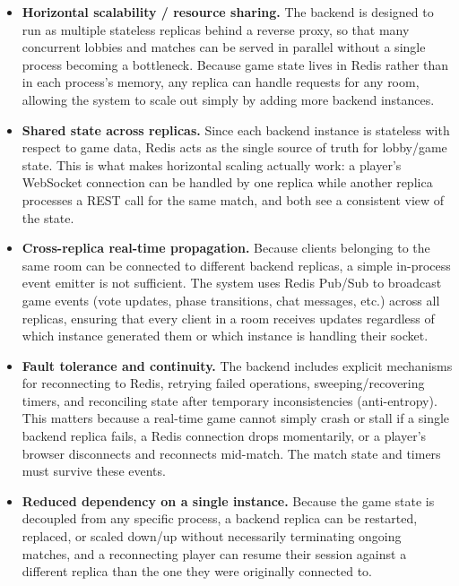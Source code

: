 \documentclass{scrartcl}
\begin{document}
\begin{itemize}
      \item \textbf{Horizontal scalability / resource sharing.} The backend is
            designed to run as multiple stateless replicas behind a reverse proxy, so
            that many concurrent lobbies and matches can be served in parallel without a
            single process becoming a bottleneck. Because game state lives in Redis
            rather than in each process's memory, any replica can handle requests for any
            room, allowing the system to scale out simply by adding more backend
            instances.

      \item \textbf{Shared state across replicas.} Since each backend instance is
            stateless with respect to game data, Redis acts as the single source of truth
            for lobby/game state. This is what makes horizontal scaling actually work: a
            player's WebSocket connection can be handled by one replica while another
            replica processes a REST call for the same match, and both see a consistent
            view of the state.

      \item \textbf{Cross-replica real-time propagation.} Because clients belonging
            to the same room can be connected to different backend replicas, a simple
            in-process event emitter is not sufficient. The system uses Redis Pub/Sub to
            broadcast game events (vote updates, phase transitions, chat messages, etc.)
            across all replicas, ensuring that every client in a room receives updates
            regardless of which instance generated them or which instance is handling
            their socket.

      \item \textbf{Fault tolerance and continuity.} The backend includes explicit
            mechanisms for reconnecting to Redis, retrying failed operations,
            sweeping/recovering timers, and reconciling state after temporary
            inconsistencies (anti-entropy). This matters because a real-time game cannot
            simply crash or stall if a single backend replica fails, a Redis connection
            drops momentarily, or a player's browser disconnects and reconnects
            mid-match. The match state and timers must survive these events.

      \item \textbf{Reduced dependency on a single instance.} Because the game
            state is decoupled from any specific process, a backend replica can be
            restarted, replaced, or scaled down/up without necessarily terminating
            ongoing matches, and a reconnecting player can resume their session against a
            different replica than the one they were originally connected to.
\end{itemize}
\end{document}

